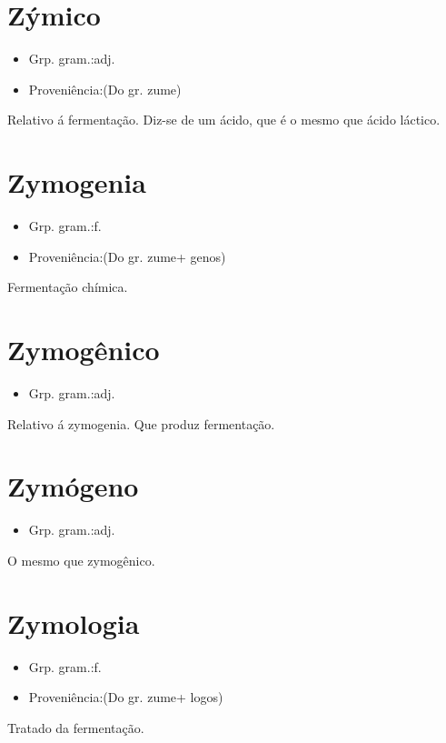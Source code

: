 \section{Zýmico}
\begin{itemize}
\item {Grp. gram.:adj.}
\end{itemize}
\begin{itemize}
\item {Proveniência:(Do gr. \textunderscore zume\textunderscore )}
\end{itemize}
Relativo á fermentação.
Diz-se de um ácido, que é o mesmo que ácido láctico.
\section{Zymogenia}
\begin{itemize}
\item {Grp. gram.:f.}
\end{itemize}
\begin{itemize}
\item {Proveniência:(Do gr. \textunderscore zume\textunderscore  + \textunderscore genos\textunderscore )}
\end{itemize}
Fermentação chímica.
\section{Zymogênico}
\begin{itemize}
\item {Grp. gram.:adj.}
\end{itemize}
Relativo á zymogenia.
Que produz fermentação.
\section{Zymógeno}
\begin{itemize}
\item {Grp. gram.:adj.}
\end{itemize}
O mesmo que \textunderscore zymogênico\textunderscore .
\section{Zymologia}
\begin{itemize}
\item {Grp. gram.:f.}
\end{itemize}
\begin{itemize}
\item {Proveniência:(Do gr. \textunderscore zume\textunderscore  + \textunderscore logos\textunderscore )}
\end{itemize}
Tratado da fermentação.
